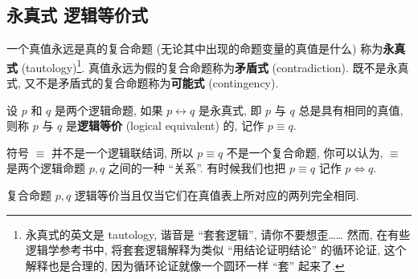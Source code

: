 \documentclass[10pt,UTF8]{book} %
\begin{document}
\subsection{永真式 \quad 逻辑等价式}

\begin{definition}
    一个真值永远是真的复合命题 (无论其中出现的命题变量的真值是什么)
    称为\textbf{永真式} (tautology)\footnote{
        永真式的英文是 tautology, 谐音是 “套套逻辑”, 请你不要想歪……
        然而, 在有些逻辑学参考书中, 将套套逻辑解释为类似 “用结论证明结论”
        的循环论证, 这个解释也是合理的, 因为循环论证就像一个圆环一样 “套” 起来了.
    }. 真值永远为假的复合命题称为\textbf{矛盾式} (contradiction).
    既不是永真式, 又不是矛盾式的复合命题称为\textbf{可能式} (contingency).
\end{definition}

\begin{definition}
    设 $p$ 和 $q$ 是两个逻辑命题, 如果 $p \leftrightarrow q$ 是永真式,
    即 $p$ 与 $q$ 总是具有相同的真值, 则称 $p$ 与 $q$ 是\textbf{逻辑等价}
    (logical equivalent) 的, 记作
    $p \equiv q$.
\end{definition}

\begin{remark}
    符号 $\equiv$ 并不是一个逻辑联结词, 所以 $p \equiv q$ 不是一个复合命题,
    你可以认为, $\equiv$ 是两个逻辑命题 $p,q$ 之间的一种 “关系”. 有时候我们也把
    $p \equiv q$ 记作 $p \Leftrightarrow q$.
\end{remark}

复合命题 $p,q$ 逻辑等价当且仅当它们在真值表上所对应的两列完全相同.
\end{document}

